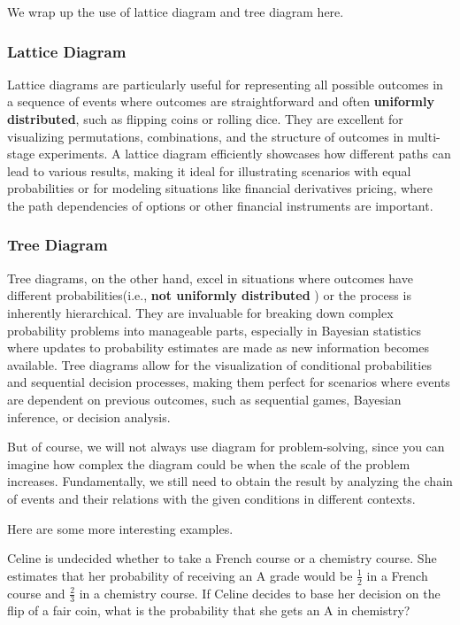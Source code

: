 We wrap up the use of lattice diagram and tree diagram here.
    \subsubsection*{Lattice Diagram}
    Lattice diagrams are particularly useful for representing all possible outcomes in a sequence of events where outcomes are straightforward and often \textbf{uniformly distributed}, such as 
    flipping coins or rolling dice. They are excellent for visualizing permutations, combinations, and the structure of outcomes in multi-stage experiments. A lattice diagram efficiently showcases how different
    paths can lead to various results, making it ideal for illustrating scenarios with equal probabilities or for modeling situations like financial derivatives pricing, where the path dependencies of 
    options or other financial instruments are important.
    \subsubsection*{Tree Diagram}
    Tree diagrams, on the other hand, excel in situations where outcomes have different probabilities(i.e., \textbf{not uniformly distributed} ) or the process is inherently hierarchical. They are invaluable for breaking down complex probability problems into 
    manageable parts, especially in Bayesian statistics where updates to probability estimates are made as new information becomes available. Tree diagrams allow for the visualization of conditional probabilities 
    and sequential decision processes, making them perfect for scenarios where events are dependent on previous outcomes, such as sequential games, Bayesian inference, or decision analysis.

    But of course, we will not always use diagram for problem-solving, since you can imagine how complex the diagram could be when the scale of the problem increases. Fundamentally,
    we still need to obtain the result by analyzing the chain of events and their relations with the given conditions in different contexts.

    Here are some more interesting examples.

    \begin{example}
        Celine is undecided whether to take a French course or a chemistry course. She estimates that her probability of receiving an A grade would be \(\frac{1}{2}\) in a French course and \(\frac{2}{3}\) in a chemistry course. If Celine decides to base her decision on the flip of a fair coin, what is the probability that she gets an A in chemistry?
        \end{example}
        
